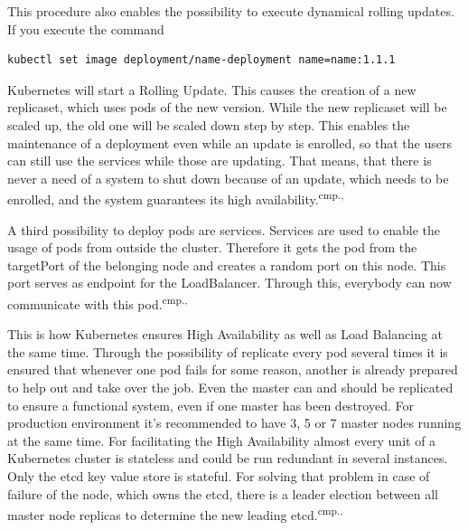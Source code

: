 This procedure also enables the possibility to execute dynamical rolling updates. If you execute the command
\begin{lstlisting}[caption={Create Kubernetes deployment},captionpos=b]
kubectl set image deployment/name-deployment name=name:1.1.1
\end{lstlisting}
Kubernetes will start a Rolling Update. This causes the creation of a new replicaset, which uses pods of the new version. While the new replicaset will be scaled up, the old one will be scaled down step by step. This enables the maintenance of a deployment even while an update is enrolled, so that the users can still use the services while those are updating. That means, that there is never a need of a system to shut down because of an update, which needs to be enrolled, and the system guarantees its high availability.\textsuperscript{cmp.\cite{13}, \cite{18}}

A third possibility to deploy pods are services. Services are used to enable the usage of pods from outside the cluster. Therefore it gets the pod from the targetPort of the belonging node and creates a random port on this node. This port serves as endpoint for the LoadBalancer. Through this, everybody can now communicate with this pod.\textsuperscript{cmp.\cite{13}, \cite{18}}

This is how Kubernetes ensures High Availability as well as Load Balancing at the same time. Through the possibility of replicate every pod several times it is ensured that whenever one pod fails for some reason, another is already prepared to help out and take over the job. Even the master can and should be replicated to ensure a functional system, even if one master has been destroyed. For production environment it's recommended to have 3, 5 or 7 master nodes running at the same time. For facilitating the High Availability almost every unit of a Kubernetes cluster is stateless and could be run redundant in several instances. Only the etcd key value store is stateful. For solving that problem in case of failure of the node, which owns the etcd, there is a leader election between all master node replicas to determine the new leading etcd.\textsuperscript{cmp.\cite{13}, \cite{18}}


